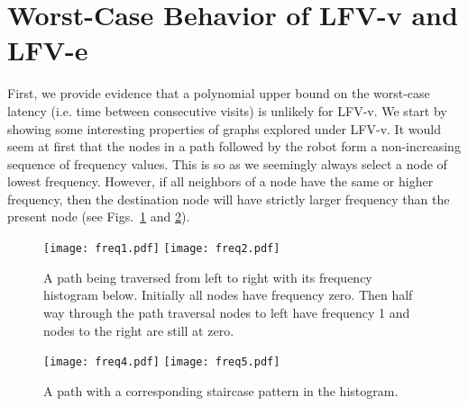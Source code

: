 \section{Worst-Case Behavior of LFV-v and LFV-e}
\label{sec:LFV}

First, we provide evidence that a polynomial upper bound on the worst-case latency (i.e. time between consecutive
visits)
is unlikely for LFV-v.
We start by showing some interesting properties of graphs explored under LFV-v.
It would seem at first that the nodes in a path followed by the robot form a non-increasing
sequence of frequency values.
This is so as we seemingly always select a node of lowest frequency. However, if
all neighbors of a node have the same or higher frequency, then
the destination node will have strictly larger frequency than the present
node (see Figs.~\ref{path} and \ref{staircase}).

\begin{figure}\centering
 \texttt{[image: freq1.pdf]}\hspace{0.3cm}
 \texttt{[image: freq2.pdf]}
\caption{A path being traversed from left to right with its frequency histogram below.
Initially all nodes have frequency zero. Then half way through the path traversal
nodes to left have frequency 1 and nodes to the right are still at zero.} \label{path}
 \end{figure}



\begin{figure}\centering
 \texttt{[image: freq4.pdf]} \hspace{0.5cm} \texttt{[image: freq5.pdf]}
\caption{A path with a corresponding staircase pattern in the histogram.} \label{staircase}
 \end{figure}

